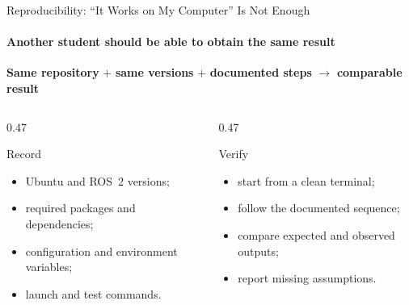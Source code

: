 \begin{frame}{Reproducibility: ``It Works on My Computer'' Is Not Enough}
\framesubtitle{Another student should be able to obtain the same result}

\begin{center}
    \textbf{Same repository}
    \(+\)
    \textbf{same versions}
    \(+\)
    \textbf{documented steps}
    \(\rightarrow\)
    \textbf{comparable result}
\end{center}

\pause

\begin{columns}[T,onlytextwidth]
    \begin{column}{0.47\textwidth}
        \begin{block}{Record}
            \begin{itemize}
                \item Ubuntu and ROS~2 versions;
                \item required packages and dependencies;
                \item configuration and environment variables;
                \item launch and test commands.
            \end{itemize}
        \end{block}
    \end{column}
    \hfill
    \begin{column}{0.47\textwidth}
        \begin{block}{Verify}
            \begin{itemize}
                \item start from a clean terminal;
                \item follow the documented sequence;
                \item compare expected and observed outputs;
                \item report missing assumptions.
            \end{itemize}
        \end{block}
    \end{column}
\end{columns}
\end{frame}


